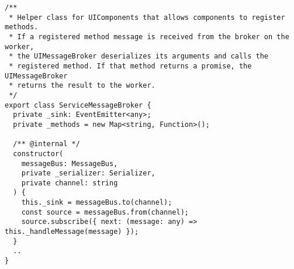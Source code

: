 \begin{verbatim}
/**
 * Helper class for UIComponents that allows components to register methods.
 * If a registered method message is received from the broker on the worker,
 * the UIMessageBroker deserializes its arguments and calls the
 * registered method. If that method returns a promise, the UIMessageBroker
 * returns the result to the worker.
 */
export class ServiceMessageBroker {
  private _sink: EventEmitter<any>;
  private _methods = new Map<string, Function>();

  /** @internal */
  constructor(
    messageBus: MessageBus,
    private _serializer: Serializer,
    private channel: string
  ) {
    this._sink = messageBus.to(channel);
    const source = messageBus.from(channel);
    source.subscribe({ next: (message: any) => this._handleMessage(message) });
  }
  ..
}
\end{verbatim}
